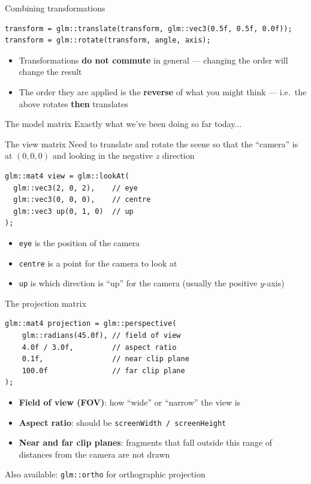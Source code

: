 \begin{frame}[fragile]{Combining transformations}
	\pause \begin{lstlisting}
transform = glm::translate(transform, glm::vec3(0.5f, 0.5f, 0.0f));
transform = glm::rotate(transform, angle, axis);
	\end{lstlisting}
	\begin{itemize}
		\pause\item Transformations \textbf{do not commute} in general ---
			changing the order will change the result
		\pause\item The order they are applied is the \textbf{reverse} of what you might think ---
			i.e.\ the above rotates \textbf{then} translates
	\end{itemize}
\end{frame}

\begin{frame}{The model matrix}
	\pause Exactly what we've been doing so far today...
\end{frame}

\begin{frame}[fragile]{The view matrix}
	\pause Need to translate and rotate the scene so that the ``camera'' is at $(0,0,0)$ and looking in the negative $z$ direction
	\pause\begin{lstlisting}
glm::mat4 view = glm::lookAt(
  glm::vec3(2, 0, 2),    // eye
  glm::vec3(0, 0, 0),    // centre
  glm::vec3 up(0, 1, 0)  // up
);
	\end{lstlisting}
	\begin{itemize}
		\pause\item \lstinline{eye} is the position of the camera
		\pause\item \lstinline{centre} is a point for the camera to look at
		\pause\item \lstinline{up} is which direction is ``up'' for the camera (usually the positive $y$-axis)
	\end{itemize}
\end{frame}

\begin{frame}[fragile]{The projection matrix}
	\pause\begin{lstlisting}
glm::mat4 projection = glm::perspective(
	glm::radians(45.0f), // field of view
	4.0f / 3.0f,         // aspect ratio
	0.1f,                // near clip plane
	100.0f               // far clip plane
);
	\end{lstlisting}
	\begin{itemize}
		\pause\item \textbf{Field of view (FOV)}: how ``wide'' or ``narrow'' the view is
		\pause\item \textbf{Aspect ratio}: should be \lstinline{screenWidth / screenHeight}
		\pause\item \textbf{Near and far clip planes}: fragments that fall outside this range of distances from the camera are not drawn
	\end{itemize}
	\pause Also available: \lstinline{glm::ortho} for orthographic projection
\end{frame}